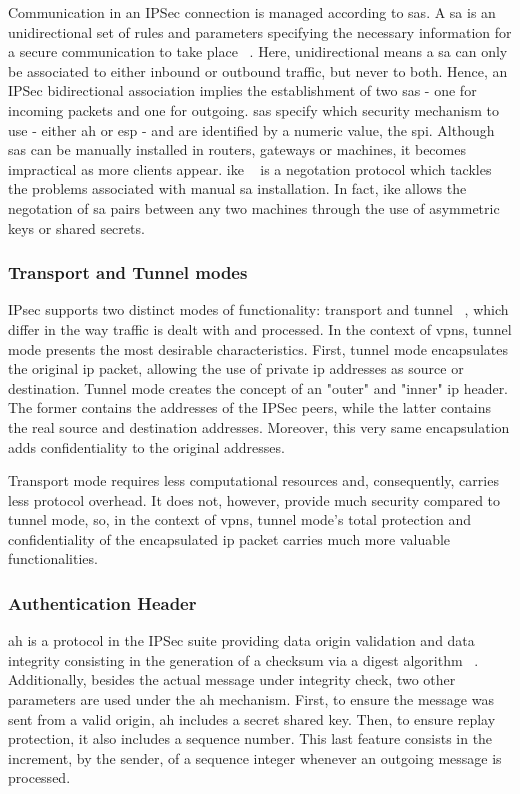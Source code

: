 \documentclass[11pt,twoside,a4paper]{report}
\begin{document}
Communication in an IPSec connection is managed according to \acp{sa}. A \ac{sa} is an unidirectional set of rules and parameters specifying the necessary information for a secure communication to take place ~\cite{rfc4301}. Here, unidirectional means a \ac{sa} can only be associated to either inbound or outbound traffic, but never to both. Hence, an IPSec bidirectional association implies the establishment of two \acp{sa} - one for incoming packets and one for outgoing. \acp{sa} specify which security mechanism to use - either \ac{ah} or \ac{esp} - and are identified by a numeric value, the \ac{spi}. Although \ac{sa}s can be manually installed in routers, gateways or machines, it becomes impractical as more clients appear. \ac{ike} ~\cite{rfc7296} is a negotation protocol which tackles the problems associated with manual \ac{sa} installation. In fact, \ac{ike} allows the negotation of \ac{sa} pairs between any two machines through the use of asymmetric keys or shared secrets.

\subsubsection{Transport and Tunnel modes}

IPsec supports two distinct modes of functionality: transport and tunnel ~\cite{rfc4301}, which differ in the way traffic is dealt with and processed. In the context of \ac{vpn}s, tunnel mode presents the
most desirable characteristics. First, tunnel mode encapsulates the original \ac{ip} packet, allowing the use of private \ac{ip} addresses as source or destination. Tunnel mode creates the concept of an "outer" and "inner" \ac{ip} header. The former contains the addresses of the IPSec peers, while the latter contains the real source and destination addresses. Moreover, this very same encapsulation adds confidentiality to the original addresses.

Transport mode requires less computational resources and, consequently, carries less protocol overhead. It does not, however, provide much security compared to tunnel mode, so, in the context of \ac{vpn}s, tunnel mode's total protection and confidentiality of the encapsulated \ac{ip} packet carries much more valuable functionalities.

\subsubsection{Authentication Header}

\ac{ah} is a protocol in the IPSec suite providing data origin validation and data integrity consisting in the generation of a checksum via a digest algorithm ~\cite{rfc4302}. Additionally, besides the actual message under integrity check, two other parameters are used under the \ac{ah} mechanism. First, to ensure the message was sent from a valid origin, \ac{ah} includes a secret shared key. Then, to ensure replay protection, it also includes a sequence number. This last feature consists in the increment, by the sender, of a sequence integer whenever an outgoing message is processed.
\end{document}
